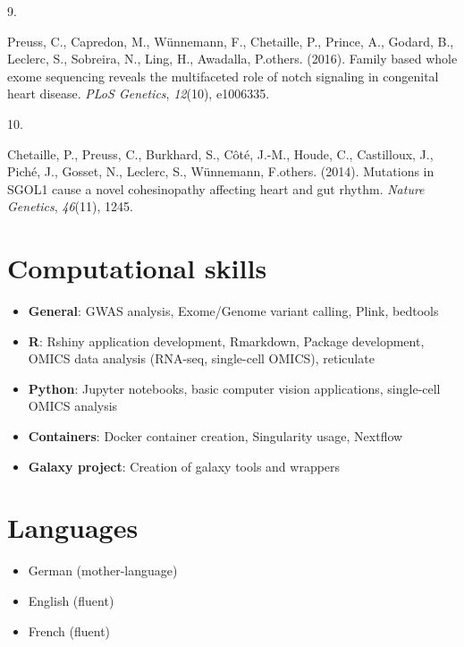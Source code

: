 \documentclass[11pt,a4paper,]{awesome-cv}
\providecommand{\tightlist}{%
	\setlength{\itemsep}{0pt}\setlength{\parskip}{0pt}}
\newlength{\csllabelwidth}
\newcommand{\CSLLeftMargin}[1]{\parbox[t]{\csllabelwidth}{#1}}
\newcommand{\CSLRightInline}[1]{\parbox[t]{\linewidth - \csllabelwidth}{#1}}
\begin{document}
\leavevmode{}%
\CSLLeftMargin{9. }
\CSLRightInline{Preuss, C., Capredon, M., Wünnemann, F., Chetaille, P.,
Prince, A., Godard, B., Leclerc, S., Sobreira, N., Ling, H., Awadalla,
P.others. (2016). Family based whole exome sequencing reveals the
multifaceted role of notch signaling in congenital heart disease.
\emph{PLoS Genetics}, \emph{12}(10), e1006335.}

\leavevmode{}%
\CSLLeftMargin{10. }
\CSLRightInline{Chetaille, P., Preuss, C., Burkhard, S., Côté, J.-M.,
Houde, C., Castilloux, J., Piché, J., Gosset, N., Leclerc, S.,
Wünnemann, F.others. (2014). Mutations in SGOL1 cause a novel
cohesinopathy affecting heart and gut rhythm. \emph{Nature Genetics},
\emph{46}(11), 1245.}

\hypertarget{computational-skills}{%
\section{\texorpdfstring{ Computational
skills}{ Computational skills}}\label{computational-skills}}

\begin{itemize}
\tightlist
\item
  \textbf{General}: GWAS analysis, Exome/Genome variant calling, Plink,
  bedtools
\item
  \textbf{R}: Rshiny application development, Rmarkdown, Package
  development, OMICS data analysis (RNA-seq, single-cell OMICS),
  reticulate
\item
  \textbf{Python}: Jupyter notebooks, basic computer vision
  applications, single-cell OMICS analysis
\item
  \textbf{Containers}: Docker container creation, Singularity usage,
  Nextflow
\item
  \textbf{Galaxy project}: Creation of galaxy tools and wrappers
\end{itemize}

\hypertarget{languages}{%
\section{\texorpdfstring{
Languages}{ Languages}}\label{languages}}

\begin{itemize}
\tightlist
\item
  German (mother-language)
\item
  English (fluent)
\item
  French (fluent)
\end{itemize}
\end{document}

